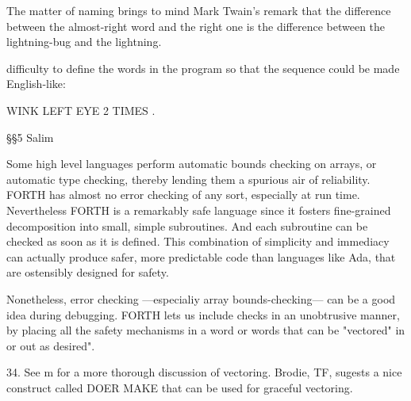 The matter of naming brings to mind Mark Twain's remark that the difference between the almost-right word and the right one is the difference between the lightning-bug and the lightning.

difficulty to define the words in the program so that the sequence could be made English-like:

WINK LEFT EYE 2 TIMES .

§§5 Salim

Some high level languages perform automatic bounds checking on arrays, or automatic type checking, thereby lending them a spurious air of reliability. FORTH has almost no error checking
of any sort, especially at run time. Nevertheless FORTH is a remarkably safe language since it fosters fine-grained decomposition into small, simple subroutines. And each subroutine can be checked as soon as it is defined. This combination of simplicity and immediacy can actually produce safer, more predictable code than languages like Ada, that are ostensibly designed for safety.

Nonetheless, error checking —especialiy array bounds-checking— can be a good idea during debugging. FORTH lets us include checks in an unobtrusive manner, by placing all the safety
mechanisms in a word or words that can be "vectored" in or out as desired".

 

34. See m for a more thorough discussion of vectoring. Brodie, TF, sugests a nice construct called DOER MAKE that can be used for graceful vectoring.